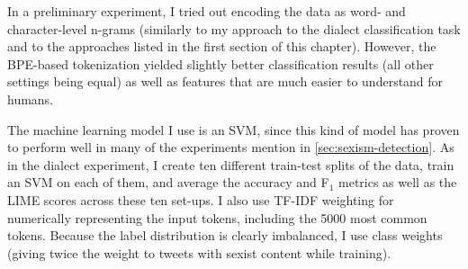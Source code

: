 In a preliminary experiment, I tried out encoding the data as word- and character-level n-grams (similarly to my approach to the dialect classification task and to the approaches listed in the first section of this chapter).
However, the BPE-based tokenization yielded slightly better classification results (all other settings being equal) as well as features that are much easier to understand for humans.

The machine learning model I use is an SVM, since this kind of model has proven to perform well in many of the experiments mention in \autoref{sec:sexism-detection}.
As in the dialect experiment, I create ten different train-test splits of the data, train an SVM on each of them, and average the accuracy and F$_1$ metrics as well as the LIME scores across these ten set-ups.
I also use TF-IDF weighting for numerically representing the input tokens, including the 5000 most common tokens.
Because the label distribution is clearly imbalanced, I use class weights (giving twice the weight to tweets with sexist content while training).


